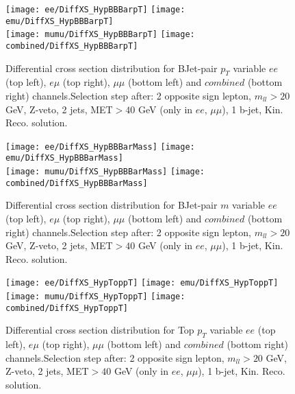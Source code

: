 \documentclass[12pt, a4paper, titlepage]{article}
\begin{document}
\clearpage
\newpage




\begin{figure}
  \texttt{[image: ee/DiffXS\_HypBBBarpT]}
  \texttt{[image: emu/DiffXS\_HypBBBarpT]}\\
  \texttt{[image: mumu/DiffXS\_HypBBBarpT]}
  \texttt{[image: combined/DiffXS\_HypBBBarpT]}
\caption{Differential cross section distribution for  BJet-pair $p_T$ variable  $ee$ (top left), $e\mu$ (top right), $\mu\mu$ (bottom left) and $combined$ (bottom right) channels.\newline Selection step after: 2 opposite sign lepton, $m_{ll}>20$ GeV, Z-veto, 2 jets, MET$>40$ GeV (only in $ee$, $\mu\mu$), 1 b-jet, Kin. Reco. solution.}
\end{figure}

\clearpage
\newpage


\begin{figure}
  \texttt{[image: ee/DiffXS\_HypBBBarMass]}
  \texttt{[image: emu/DiffXS\_HypBBBarMass]}\\
  \texttt{[image: mumu/DiffXS\_HypBBBarMass]}
  \texttt{[image: combined/DiffXS\_HypBBBarMass]}
\caption{Differential cross section distribution for  BJet-pair $m$ variable  $ee$ (top left), $e\mu$ (top right), $\mu\mu$ (bottom left) and $combined$ (bottom right) channels.\newline Selection step after: 2 opposite sign lepton, $m_{ll}>20$ GeV, Z-veto, 2 jets, MET$>40$ GeV (only in $ee$, $\mu\mu$), 1 b-jet, Kin. Reco. solution.}
\end{figure}

\clearpage
\newpage



\begin{figure}
  \texttt{[image: ee/DiffXS\_HypToppT]}
  \texttt{[image: emu/DiffXS\_HypToppT]}\\
  \texttt{[image: mumu/DiffXS\_HypToppT]}
  \texttt{[image: combined/DiffXS\_HypToppT]}
\caption{Differential cross section distribution for  Top $p_T$ variable  $ee$ (top left), $e\mu$ (top right), $\mu\mu$ (bottom left) and $combined$ (bottom right) channels.\newline Selection step after: 2 opposite sign lepton, $m_{ll}>20$ GeV, Z-veto, 2 jets, MET$>40$ GeV (only in $ee$, $\mu\mu$), 1 b-jet, Kin. Reco. solution.}
\end{figure}
\end{document}
